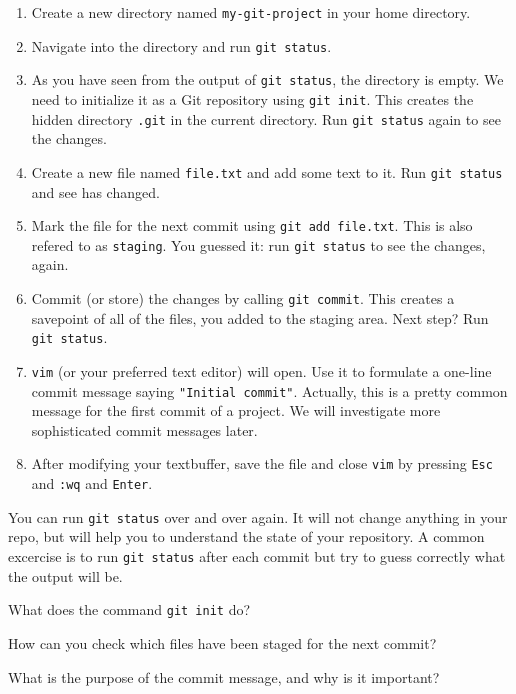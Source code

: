 \begin{challenge}
\begin{task}
        \begin{enumerate}
            \item Create a new directory named \texttt{my-git-project} in your home directory.
            \item Navigate into the directory and run \texttt{git status}.
            \item As you have seen from the output of \texttt{git status}, the directory is empty. We need to initialize it as a Git repository using \texttt{git init}. This creates the hidden directory \texttt{.git} in the current directory. Run \texttt{git status} again to see the changes.
            \item Create a new file named \texttt{file.txt} and add some text to it. Run \texttt{git status} and see has changed.
            \item Mark the file for the next commit using \texttt{git add file.txt}. This is also refered to as \texttt{staging}. You guessed it: run \texttt{git status} to see the changes, again. 
            \item Commit (or store) the changes by calling \texttt{git commit}. This creates a savepoint of all of the files, you added to the staging area. Next step? Run \texttt{git status}.
            \item \texttt{vim} (or your preferred text editor) will open. Use it to formulate a one-line commit message saying \texttt{"Initial commit"}. Actually, this is a pretty common message for the first commit of a project. We will investigate more sophisticated commit messages later.
            \item After modifying your textbuffer, save the file and close \texttt{vim} by pressing \texttt{Esc} and \texttt{:wq} and \texttt{Enter}.
        \end{enumerate}
        You can run \texttt{git status} over and over again. 
        It will not change anything in your repo, but will help you to understand the state of your repository.
        A common excercise is to run \texttt{git status} after each commit but try to guess correctly what the output will be.

        \begin{questions}
            \item What does the command \texttt{git init} do?
            \item How can you check which files have been staged for the next commit?
            \item What is the purpose of the commit message, and why is it important?
        \end{questions}
    \end{task}


\end{challenge}
